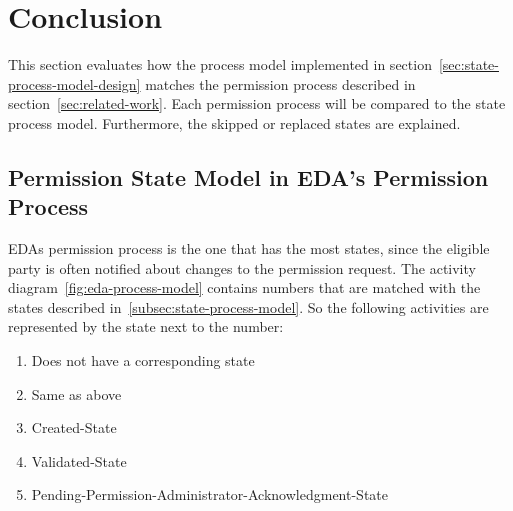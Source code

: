\section{Conclusion}\label{sec:conclusion}
This section evaluates how the process model implemented in section\ \ref{sec:state-process-model-design} matches the permission process described in section\ \ref{sec:related-work}.
Each permission process will be compared to the state process model.
Furthermore, the skipped or replaced states are explained.

\subsection{Permission State Model in EDA's Permission Process}\label{subsec:permission-state-model-in-eda's-permission-process}
EDAs permission process is the one that has the most states, since the eligible party is often notified about changes to the permission request.
The activity diagram\ \ref{fig:eda-process-model} contains numbers that are matched with the states described in\ \ref{subsec:state-process-model}.
So the following activities are represented by the state next to the number:
\begin{enumerate}
    \item Does not have a corresponding state
    \item Same as above
    \item Created-State
    \item Validated-State
    \item Pending-Permission-Administrator-Acknowledgment-State
\end{enumerate}

